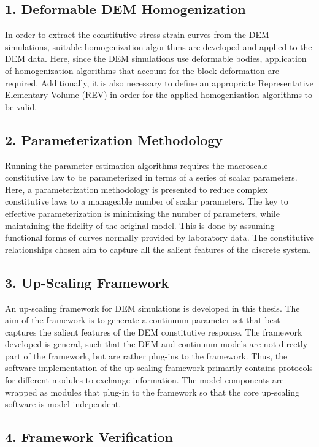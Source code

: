 \subsection*{1. Deformable DEM Homogenization}

In order to extract the constitutive stress-strain curves from the DEM simulations, suitable homogenization algorithms are developed and applied to the DEM data. Here, since the DEM simulations use deformable bodies, application of homogenization algorithms that account for the block deformation are required.  Additionally, it is also necessary to define an appropriate Representative Elementary Volume (REV) in order for the applied homogenization algorithms to be valid.

\subsection*{2. Parameterization Methodology}

Running the parameter estimation algorithms requires the macroscale constitutive law to be parameterized in terms of a series of scalar parameters. Here, a parameterization methodology is presented to reduce complex constitutive laws to a manageable number of scalar parameters. The key to effective parameterization is minimizing the number of parameters, while maintaining the fidelity of the original model. This is done by assuming functional forms of curves normally provided by laboratory data. The constitutive relationships chosen aim to capture all the salient features of the discrete system. 

\subsection*{3. Up-Scaling Framework}

An up-scaling framework for DEM simulations is developed in this thesis. The aim of the framework is to generate a continuum parameter set that best captures the salient features of the DEM constitutive response. The framework developed is general, such that the DEM and continuum models are not directly part of the framework, but are rather plug-ins to the framework. Thus, the software implementation of the up-scaling framework primarily contains protocols for different modules to exchange information. The model components are wrapped as modules that plug-in to the framework so that the core up-scaling software is model independent. 

\subsection*{4. Framework Verification}

